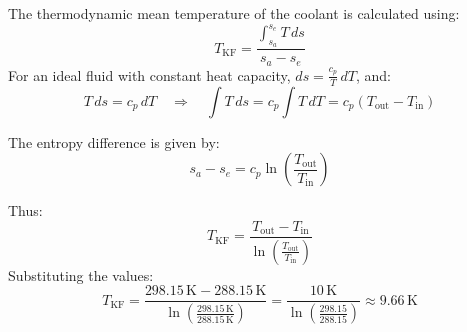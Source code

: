 The thermodynamic mean temperature of the coolant is calculated using:  
\[
T_{\text{KF}} = \frac{\int_{s_a}^{s_e} T \, ds}{s_a - s_e}
\]  
For an ideal fluid with constant heat capacity, \( ds = \frac{c_p}{T} \, dT \), and:  
\[
T \, ds = c_p \, dT \quad \Rightarrow \quad \int T \, ds = c_p \int T \, dT = c_p \left( T_{\text{out}} - T_{\text{in}} \right)
\]  

The entropy difference is given by:  
\[
s_a - s_e = c_p \ln \left( \frac{T_{\text{out}}}{T_{\text{in}}} \right)
\]  

Thus:  
\[
T_{\text{KF}} = \frac{T_{\text{out}} - T_{\text{in}}}{\ln \left( \frac{T_{\text{out}}}{T_{\text{in}}} \right)}
\]  
Substituting the values:  
\[
T_{\text{KF}} = \frac{298.15 \, \text{K} - 288.15 \, \text{K}}{\ln \left( \frac{298.15 \, \text{K}}{288.15 \, \text{K}} \right)} = \frac{10 \, \text{K}}{\ln \left( \frac{298.15}{288.15} \right)} \approx 9.66 \, \text{K}
\]